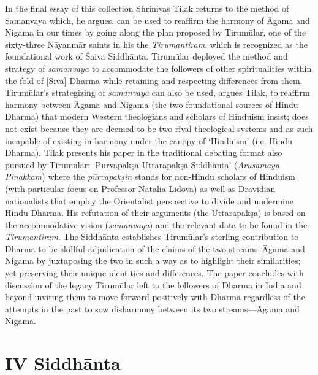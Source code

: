 In the final essay of this collection Shrinivas Tilak returns to the method of Samanvaya which, he argues, can be used to reaffirm the harmony of Āgama and Nigama in our times by going along the plan proposed by Tirumūlar, one of the sixty-three Nāyanmār saints in his the \textit{Tirumantiram}, which is recognized as the foundational work of Śaiva Siddhānta. Tirumūlar deployed the method and strategy of \textit{samanvaya} to accommodate the followers of other spiritualities within the fold of [Siva] Dharma while retaining and respecting differences from them. Tirumūlar’s strategizing of \textit{samanvaya} can also be used, argues Tilak, to reaffirm harmony between Āgama and Nigama (the two foundational sources of Hindu Dharma) that modern Western theologians and scholars of Hinduism insist; does not exist because they are deemed to be two rival theological systems and as such incapable of existing in harmony under the canopy of ‘Hinduism’ (i.e. Hindu Dharma). Tilak presents his paper in the traditional debating format also pursued by Tirumūlar: ‘Pūrvapakşa-Uttarapakşa-Siddhānta’ (\textit{Arusamaya Pinakkam}) where the \textit{pūrvapakşin} stands for non-Hindu scholars of Hinduism (with particular focus on Professor Natalia Lidova) as well as Dravidian nationalists that employ the Orientalist perspective to divide and undermine Hindu Dharma. His refutation of their arguments (the Uttarapakşa) is based on the accommodative vision (\textit{samanvaya}) and the relevant data to be found in the \textit{Tirumantiram}. The Siddhānta establishes Tirumūlar’s sterling contribution to Dharma to be skillful adjudication of the claims of the two streams--Āgama and Nigama by juxtaposing the two in such a way as to highlight their similarities; yet preserving their unique identities and differences. The paper concludes with discussion of the legacy Tirumūlar left to the followers of Dharma in India and beyond inviting them to move forward positively with Dharma regardless of the attempts in the past to sow disharmony between its two streams—Āgama and Nigama.


\section*{IV Siddhānta}

